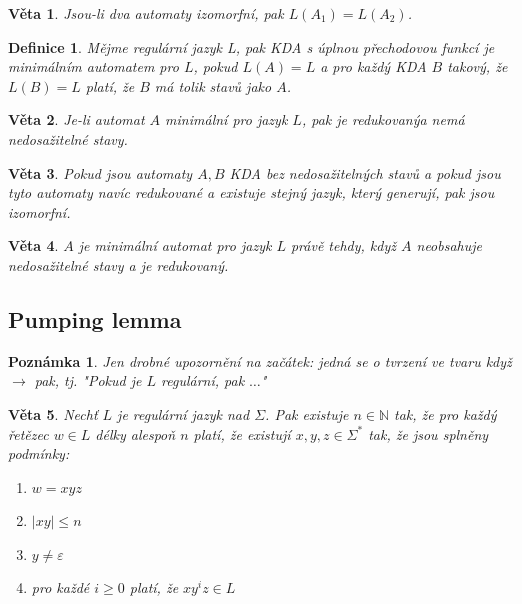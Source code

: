 \documentclass[10pt,a4paper]{article}
\theoremstyle{note}
\newtheorem{veta}{Věta}
\newtheorem{definice}{Definice}
\newtheorem{poznamka}{Poznámka}
\begin{document}
\begin{veta}
Jsou-li dva automaty izomorfní, pak $L(A_1) = L(A_2)$.
\end{veta}

\begin{definice}
Mějme regulární jazyk L, pak KDA s úplnou přechodovou funkcí je \textit{minimálním automatem} pro $L$,
pokud $L(A) = L$ a pro každý KDA $B$ takový, že $L(B) = L$ platí, že $B$ má tolik stavů jako $A$.
\end{definice}

\begin{veta}
Je-li automat $A$ minimální pro jazyk $L$, pak je \textit{redukovaný}a nemá nedosažitelné stavy.
\end{veta}

\begin{veta}
Pokud jsou automaty $A, B$ KDA bez nedosažitelných stavů a pokud jsou tyto automaty navíc redukované a
existuje stejný jazyk, který generují, pak jsou izomorfní.
\end{veta}

\begin{veta}
$A$ je minimální automat pro jazyk $L$ právě tehdy, když $A$ neobsahuje nedosažitelné stavy a je redukovaný.
\end{veta}



	\subsection{Pumping lemma}



\begin{poznamka}
Jen drobné upozornění na začátek: jedná se o tvrzení ve tvaru když $\rightarrow$ pak, tj. "Pokud je $L$ regulární, pak $\ldots$"
\end{poznamka}

\begin{veta}
Nechť $L$ je regulární jazyk nad $\Sigma$. Pak existuje $n \in \mathbb{N}$ tak, že pro každý řetězec $w \in L$ délky alespoň $n$ platí, že existují $x,y,z \in \Sigma^*$ tak, že jsou splněny podmínky:
\begin{enumerate}
\item
$w = xyz$
\item
$|xy| \le n$
\item
$y \neq \varepsilon$
\item
pro každé $i \ge 0$ platí, že $xy^iz \in L$
\end{enumerate}
\end{veta}
\end{document}
